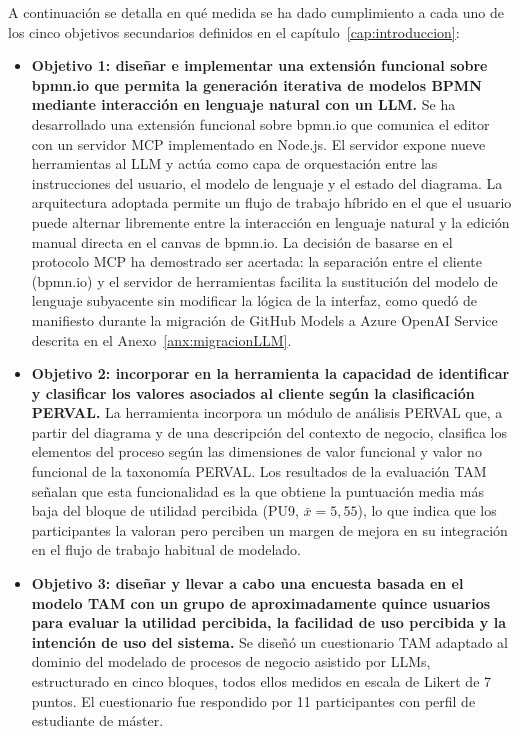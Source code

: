 A continuación se detalla en qué medida se ha dado cumplimiento a cada uno de los cinco objetivos secundarios definidos en el capítulo~\ref{cap:introduccion}:

\begin{itemize}

  \item \textbf{Objetivo 1: diseñar e implementar una extensión funcional sobre bpmn.io que permita la generación iterativa de modelos BPMN mediante interacción en lenguaje natural con un LLM.}
  Se ha desarrollado una extensión funcional sobre bpmn.io que comunica el editor con un servidor MCP implementado en Node.js. El servidor expone nueve herramientas al LLM y actúa como capa de orquestación entre las instrucciones del usuario, el modelo de lenguaje y el estado del diagrama. La arquitectura adoptada permite un flujo de trabajo híbrido en el que el usuario puede alternar libremente entre la interacción en lenguaje natural y la edición manual directa en el canvas de bpmn.io. La decisión de basarse en el protocolo MCP ha demostrado ser acertada: la separación entre el cliente (bpmn.io) y el servidor de herramientas facilita la sustitución del modelo de lenguaje subyacente sin modificar la lógica de la interfaz, como quedó de manifiesto durante la migración de GitHub Models a Azure OpenAI Service descrita en el Anexo~\ref{anx:migracionLLM}.

  \item \textbf{Objetivo 2: incorporar en la herramienta la capacidad de identificar y clasificar los valores asociados al cliente según la clasificación PERVAL.}
  La herramienta incorpora un módulo de análisis PERVAL que, a partir del diagrama y de una descripción del contexto de negocio, clasifica los elementos del proceso según las dimensiones de valor funcional y valor no funcional de la taxonomía PERVAL. Los resultados de la evaluación TAM señalan que esta funcionalidad es la que obtiene la puntuación media más baja del bloque de utilidad percibida (PU9, $\bar{x} = 5{,}55$), lo que indica que los participantes la valoran pero perciben un margen de mejora en su integración en el flujo de trabajo habitual de modelado.

  \item \textbf{Objetivo 3: diseñar y llevar a cabo una encuesta basada en el modelo TAM con un grupo de aproximadamente quince usuarios para evaluar la utilidad percibida, la facilidad de uso percibida y la intención de uso del sistema.}
  Se diseñó un cuestionario TAM adaptado al dominio del modelado de procesos de negocio asistido por LLMs, estructurado en cinco bloques, todos ellos medidos en escala de Likert de 7 puntos. El cuestionario fue respondido por 11 participantes con perfil de estudiante de máster.


\end{itemize}
